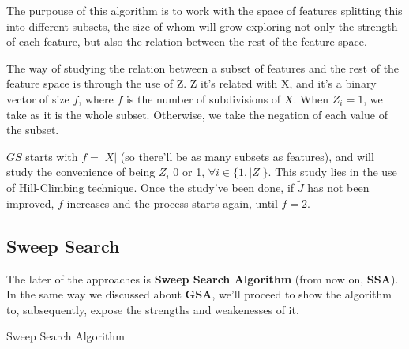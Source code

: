 \documentclass{article}
\begin{document}
The purpouse of this algorithm is to work with the space of features splitting this into different subsets, the size of whom will grow exploring not only the strength of each feature, but also the relation between the rest of the feature space.

The way of studying the relation between a subset of features and the rest of the feature space is through the use of Z. Z it's related with X, and it's a binary vector of size $f$, where $f$ is the number of subdivisions of $X$. When $Z_i=1$, we take as it is the whole subset. Otherwise, we take the negation of each value of the subset.

$GS$ starts with $f=|X|$ (so there'll be as many subsets as features), and will study the convenience of being $Z_i$ 0 or 1, $\forall i \in \{1,|Z|\}$. This study lies in the use of Hill-Climbing technique. Once the study've been done, if $\tilde{J}$ has not been improved, $f$ increases and the process starts again, until $f=2$.

\subsection{Sweep Search}
The later of the approaches is \textbf{Sweep Search Algorithm} (from now on, \textbf{SSA}). In the same way we discussed about \textbf{GSA}, we'll proceed to show the algorithm to, subsequently, expose the strengths and weakenesses of it.

\begin{algorithm}
\dontprintsemicolon
{}
\caption{Sweep Search Algorithm\label{SSA}}
\end{algorithm}
\end{document}
